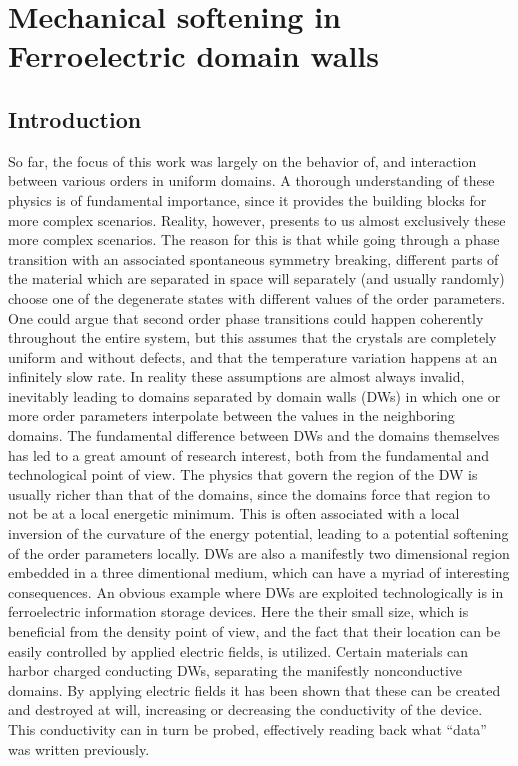 \chapter{Mechanical softening in Ferroelectric domain walls}


\section{Introduction}
So far, the focus of this work was largely on the behavior of, and interaction between various orders in uniform domains.
A thorough understanding of these physics is of fundamental importance, since it provides the building blocks for more complex scenarios.
Reality, however, presents to us almost exclusively these more complex scenarios.
The reason for this is that while going through a phase transition with an associated spontaneous symmetry breaking, different parts of the material which are separated in space will separately (and usually randomly) choose one of the degenerate states with different values of the order parameters.
One could argue that second order phase transitions could happen coherently throughout the entire system, but this assumes that the crystals are completely uniform and without defects, and that the temperature variation happens at an infinitely slow rate.
In reality these assumptions are almost always invalid, inevitably leading to domains separated by domain walls (DWs) in which one or more order parameters interpolate between the values in the neighboring domains.
The fundamental difference between DWs and the domains themselves has led to a great amount of research interest, both from the fundamental and technological point of view.
The physics that govern the region of the DW is usually richer than that of the domains, since the domains force that region to not be at a local energetic minimum.
This is often associated with a local inversion of the curvature of the energy potential, leading to a potential softening of the order parameters locally.
DWs are also a manifestly two dimensional region embedded in a three dimentional medium, which can have a myriad of interesting consequences.
An obvious example where DWs are exploited technologically is in ferroelectric information storage devices.
Here the their small size, which is beneficial from the density point of view, and the fact that their location can be easily controlled by applied electric fields, is utilized.
Certain materials can harbor charged conducting DWs, separating the manifestly nonconductive domains.
By applying electric fields it has been shown that these can be created and destroyed at will, increasing or decreasing the conductivity of the device.
This conductivity can in turn be probed, effectively reading back what ``data'' was written previously.

